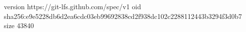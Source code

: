 version https://git-lfs.github.com/spec/v1
oid sha256:e9e5228db6d2ea6cdc03eb99692838cd2f938dc102c2288112443b3294f3d0b7
size 43840
